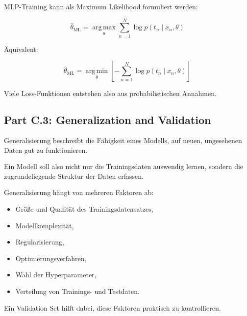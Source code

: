\documentclass[11pt,a4paper]{scrartcl}
\begin{document}
\begin{answerbox}
    MLP-Training kann als Maximum Likelihood formuliert werden:

    \[
        \boxed{
            \hat\theta_{\mathrm{ML}}
            =
            \operatorname*{arg\,max}_{\theta}
            \sum_{n=1}^{N}
            \log p(t_n \mid x_n,\theta)
        }
    \]

    Äquivalent:

    \[
        \boxed{
            \hat\theta_{\mathrm{ML}}
            =
            \operatorname*{arg\,min}_{\theta}
            \left[
                -
                \sum_{n=1}^{N}
                \log p(t_n \mid x_n,\theta)
            \right]
        }
    \]

    Viele Loss-Funktionen entstehen also aus probabilistischen Annahmen.
\end{answerbox}

\subsection{Part C.3: Generalization and Validation}

\begin{notebox}
    Generalisierung beschreibt die Fähigkeit eines Modells, auf neuen,
    ungesehenen Daten gut zu funktionieren.

    Ein Modell soll also nicht nur die Trainingsdaten auswendig lernen, sondern
    die zugrundeliegende Struktur der Daten erfassen.
\end{notebox}

\begin{solutionbox}
    Generalisierung hängt von mehreren Faktoren ab:

    \begin{itemize}
        \item Größe und Qualität des Trainingsdatensatzes,
        \item Modellkomplexität,
        \item Regularisierung,
        \item Optimierungsverfahren,
        \item Wahl der Hyperparameter,
        \item Verteilung von Trainings- und Testdaten.
    \end{itemize}

    Ein Validation Set hilft dabei, diese Faktoren praktisch zu kontrollieren.
\end{solutionbox}
\end{document}
